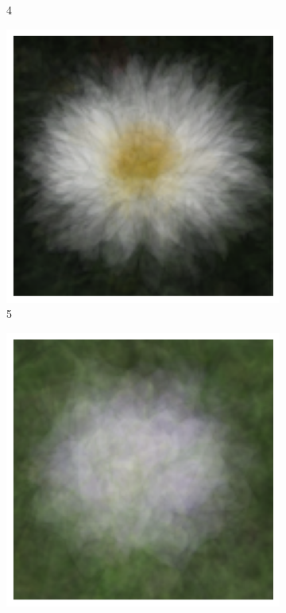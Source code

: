 \documentclass{article}
\begin{document}
\begin{figure}
\begin{subfigure}[b]{0.09\textwidth}
		\caption{4}
	\end{subfigure}
	\begin{subfigure}[b]{0.09\textwidth}
		\includegraphics[width= \textwidth]{ave5}
		\caption{5}
	\end{subfigure}
	\begin{subfigure}[b]{0.09\textwidth}
		\includegraphics[width= \textwidth]{ave6}

\end{subfigure}
\end{figure}
\end{document}

